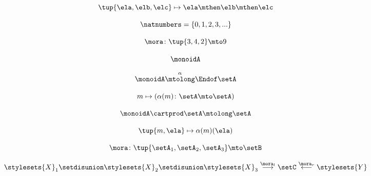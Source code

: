 {\begin{forslides}
    \begin{equation}
        \label{eq:slides_multicategories_47}
        \tup{\ela, \elb, \elc} \mapsto \ela \mthen \elb \mthen \elc
    \end{equation}

    \begin{equation}
        \label{eq:slides_multicategories_48}
        \natnumbers = \{0, 1, 2, 3, ... \}
    \end{equation}

    \begin{equation}
        \label{eq:slides_multicategories_49}
        \mora \colon \tup{3,4,2} \mto 9
    \end{equation}

    \begin{equation}
        \label{eq:slides_multicategories_50}
        \monoidA
    \end{equation}

    \begin{equation}
        \label{eq:slides_multicategories_51}
        \monoidA \overset{\alpha}{\mtolong} \Endof \setA
    \end{equation}

    \begin{equation}
        \label{eq:slides_multicategories_52}
        m \mapsto ( \alpha(m) \colon \setA \mto \setA)
    \end{equation}

    \begin{equation}
        \label{eq:slides_multicategories_53}
        \monoidA \cartprod \setA \mtolong \setA
    \end{equation}

    \begin{equation}
        \label{eq:slides_multicategories_54}
        \tup{m, \ela} \mapsto \alpha(m)(\ela)
    \end{equation}

    \begin{equation}
        \label{eq:slides_multicategories_55}
        \mora \colon \tup{\setA_1, \setA_2, \setA_3} \mto \setB
    \end{equation}

    \begin{equation}
        \label{eq:slides_multicategories_56}
        \stylesets{X}_1 \setdisunion  \stylesets{X}_2 \setdisunion  \stylesets{X}_3 \overset{\mora_l}{\longrightarrow} \setC \overset{\mora_r}{\longleftarrow}  \stylesets{Y}
    \end{equation}


\end{forslides}}
